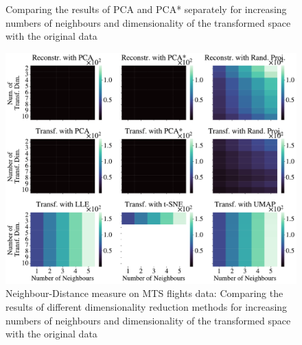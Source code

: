 \documentclass[pdftex,12pt,a4paper]{report}
\begin{document}
\begin{figure}
    \hfill
    \hfill
    \caption{Comparing the results of PCA and PCA* separately for increasing numbers of neighbours and dimensionality of the transformed space with the original data}
\end{figure}

\begin{figure}
    \includegraphics[width = \textwidth]{images/real-world/flights/dyn_low_dim_vs_num_neigh/euclidean/all_methods_1runs_10lines_4660points_5neighbours.pdf}
    \caption{Neighbour-Distance measure on MTS flights data: Comparing the results of different dimensionality reduction methods for increasing numbers of neighbours and dimensionality of the transformed space with the original data} \label{fig:num_neigh_vs_dyn_low-eucl-flights}
\end{figure}
\end{document}

